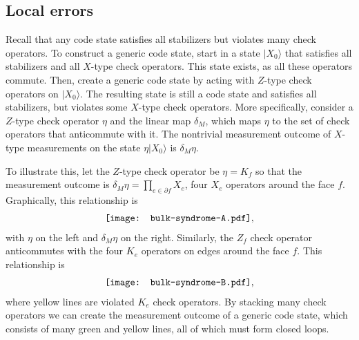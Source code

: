 \subsection{Local errors} \label{sub:local}

Recall that any code state satisfies all stabilizers but violates many check operators. To construct a generic code state, start in a state $|X_0\rangle$ that satisfies all stabilizers and all $X$-type check operators. This state exists, as all these operators commute. Then, create a generic code state by acting with $Z$-type check operators on $|X_0\rangle$. The resulting state is still a code state and satisfies all stabilizers, but violates some $X$-type check operators. 
More specifically, consider a $Z$-type check operator $\eta$ and the linear map $\delta_M$, which maps $\eta$ to the set of check operators that anticommute with it. The nontrivial measurement outcome of $X$-type measurements on the state $\eta |X_0\rangle$ is $\delta_M \eta$.

To illustrate this, let the $Z$-type check operator be $\eta = K_f$ so that the measurement outcome is $\delta_M\eta = \prod_{e\in \partial f} X_e$, four $X_e$ operators around the face $f$. Graphically, this relationship is
\begin{align}
\vcenter{\hbox{\texttt{[image: bulk-syndrome-A.pdf]}}}, \label{eqn:bulk-error-A}
\end{align}
with $\eta$ on the left and $\delta_M \eta$ on the right. Similarly, the $Z_f$ check operator anticommutes with the four $K_e$ operators on edges around the face $f$. This relationship is
\begin{align}
\vcenter{\hbox{\texttt{[image: bulk-syndrome-B.pdf]}}}, \label{eqn:bulk-error-B}
\end{align}
where yellow lines are violated $K_e$ check operators. By stacking many check operators we can create the measurement outcome of a generic code state, which consists of many green and yellow lines, all of which must form closed loops. 

